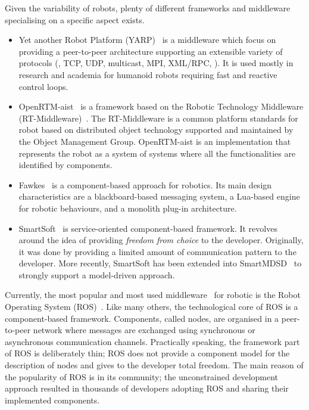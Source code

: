 Given the variability of robots, plenty of different frameworks and middleware specialising on a specific aspect exists. 
\begin{itemize}
\item Yet another Robot Platform (YARP)~\cite{metta2006yarp} is a middleware which focus on providing a peer-to-peer architecture supporting an extensible variety of protocols (\eg, TCP, UDP, multicast, MPI, XML/RPC, \etc). It is used mostly in research and academia for humanoid robots requiring fast and reactive control loops. 
\item OpenRTM-aist~\cite{ando2008software} is a framework based on the Robotic Technology Middleware (RT-Middleware)~\cite{ando2005rt}. The RT-Middleware is a common platform standards for robot based on distributed object technology supported and maintained by the Object Management Group. OpenRTM-aist is an implementation that represents the robot as a system of systems where all the functionalities are identified by components.
\item Fawkes~\cite{niemueller2010design} is a component-based approach for robotics. Its main design characteristics are a blackboard-based messaging system, a Lua-based engine for robotic behaviours, and a monolith plug-in architecture.
\item SmartSoft~\cite{schlegel1999software} is service-oriented component-based framework. It revolves around the idea of providing \textit{freedom from choice} to the developer. Originally, it was done by providing a limited amount of communication pattern to the developer. More recently, SmartSoft has been extended into SmartMDSD~\cite{dennis2016smartmdsd} to strongly support a model-driven approach.
\end{itemize}

Currently, the most popular and most used middleware~\cite{elkady2012robotics} for robotic is the Robot Operating System (ROS)~\cite{quigley2009ros}. Like many others, the technological core of ROS is a component-based framework. Components, called nodes, are organised in a peer-to-peer network where messages are exchanged using synchronous or asynchronous communication channels. Practically speaking, the framework part of ROS is deliberately thin; ROS does not provide a component model for the description of nodes and gives to the developer total freedom. The main reason of the popularity of ROS is in its community; the unconstrained development approach resulted in thousands of developers adopting ROS and sharing their implemented components.

